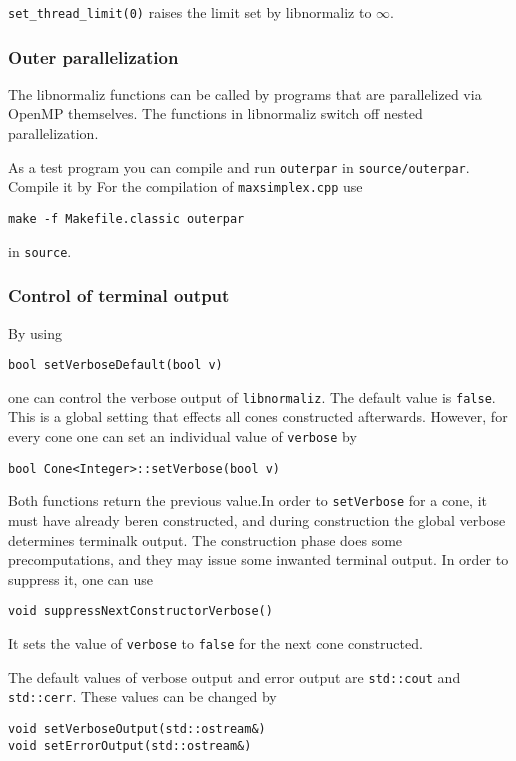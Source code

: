 \begin{small}
\verb|set_thread_limit(0)| raises the limit set by libnormaliz to $\infty$.

\subsubsection{Outer parallelization}

The libnormaliz functions can be called by programs that are parallelized via OpenMP themselves. The functions in libnormaliz switch off nested parallelization.

As a test program you can compile and run \verb|outerpar| in \verb|source/outerpar|. Compile it by For the compilation of \verb|maxsimplex.cpp| use
\begin{Verbatim}
make -f Makefile.classic outerpar
\end{Verbatim}
in \verb|source|.

\subsubsection{Control of terminal output}
By using
\begin{Verbatim}
bool setVerboseDefault(bool v)
\end{Verbatim}
one can control the verbose output of \verb|libnormaliz|. The default value is \verb|false|. This is a global setting that effects all cones constructed afterwards. However, for every cone one can set an individual value of \verb|verbose| by
\begin{Verbatim}
bool Cone<Integer>::setVerbose(bool v)
\end{Verbatim}
Both functions return the previous value.In order to \verb|setVerbose| for a cone, it must have already beren constructed, and during construction the global verbose determines terminalk output. The construction phase does some precomputations, and they may issue some inwanted terminal output. In order to suppress it, one can use
\begin{Verbatim}
void suppressNextConstructorVerbose()
\end{Verbatim}
It sets the value of \verb|verbose| to \verb|false| for the next cone constructed. 


The default values of verbose output and error output are \verb|std::cout| and \verb|std::cerr|. These values can be changed by
\begin{Verbatim}
void setVerboseOutput(std::ostream&)
void setErrorOutput(std::ostream&)
\end{Verbatim}


\end{small}
